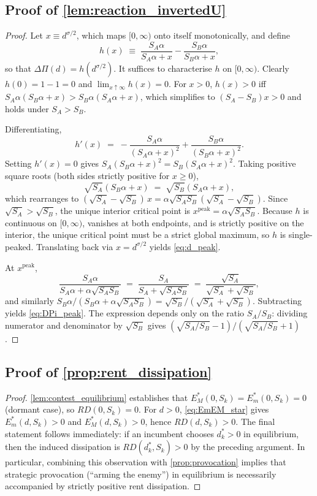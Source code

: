 \subsection*{Proof of \autoref{lem:reaction_invertedU}} \label{app:proof:reaction_invertedU}

\begin{proof}
Let $x\equiv d^{\sigma/2}$, which maps $[0,\infty)$ onto itself monotonically, and define
\[
h(x)\;\equiv\;\frac{S_A\alpha}{S_A\alpha+x}-\frac{S_B\alpha}{S_B\alpha+x},
\]
so that $\Delta\Pi(d)=h(d^{\sigma/2})$. It suffices to characterise $h$ on $[0,\infty)$. Clearly $h(0)=1-1=0$ and $\lim_{x\uparrow\infty}h(x)=0$. For $x>0$, $h(x)>0$ iff $S_A\alpha(S_B\alpha+x)>S_B\alpha(S_A\alpha+x)$, which simplifies to $(S_A-S_B)x>0$ and holds under $S_A>S_B$.

Differentiating,
\[
h'(x)\;=\;-\frac{S_A\alpha}{(S_A\alpha+x)^2}+\frac{S_B\alpha}{(S_B\alpha+x)^2}.
\]
Setting $h'(x)=0$ gives $S_A(S_B\alpha+x)^2=S_B(S_A\alpha+x)^2$. Taking positive square roots (both sides strictly positive for $x\ge 0$),
\[
\sqrt{S_A}(S_B\alpha+x)\;=\;\sqrt{S_B}(S_A\alpha+x),
\]
which rearranges to $(\sqrt{S_A}-\sqrt{S_B})\,x=\alpha\sqrt{S_A S_B}(\sqrt{S_A}-\sqrt{S_B})$. Since $\sqrt{S_A}>\sqrt{S_B}$, the unique interior critical point is $x^{\mathrm{peak}}=\alpha\sqrt{S_A S_B}$. Because $h$ is continuous on $[0,\infty)$, vanishes at both endpoints, and is strictly positive on the interior, the unique critical point must be a strict global maximum, so $h$ is single-peaked. Translating back via $x=d^{\sigma/2}$ yields \autoref{eq:d_peak}.

At $x^{\mathrm{peak}}$,
\[
\frac{S_A\alpha}{S_A\alpha+\alpha\sqrt{S_A S_B}}\;=\;\frac{S_A}{S_A+\sqrt{S_A S_B}}\;=\;\frac{\sqrt{S_A}}{\sqrt{S_A}+\sqrt{S_B}},
\]
and similarly $S_B\alpha/(S_B\alpha+\alpha\sqrt{S_A S_B})=\sqrt{S_B}/(\sqrt{S_A}+\sqrt{S_B})$. Subtracting yields \autoref{eq:DPi_peak}. The expression depends only on the ratio $S_A/S_B$: dividing numerator and denominator by $\sqrt{S_B}$ gives $(\sqrt{S_A/S_B}-1)/(\sqrt{S_A/S_B}+1)$.
\end{proof}

\subsection*{Proof of \autoref{prop:rent_dissipation}} \label{app:proof:rent_dissipation}

\begin{proof}
\autoref{lem:contest_equilibrium} establishes that $E_M^*(0,S_k)=E_m^*(0,S_k)=0$ (dormant case), so $RD(0,S_k)=0$. For $d>0$, \autoref{eq:EmEM_star} gives $E_m^*(d,S_k)>0$ and $E_M^*(d,S_k)>0$, hence $RD(d,S_k)>0$. The final statement follows immediately: if an incumbent chooses $d_k^*>0$ in equilibrium, then the induced dissipation is $RD(d_k^*,S_k)>0$ by the preceding argument. In particular, combining this observation with \autoref{prop:provocation} implies that strategic provocation (``arming the enemy'') in equilibrium is necessarily accompanied by strictly positive rent dissipation.
\end{proof}

